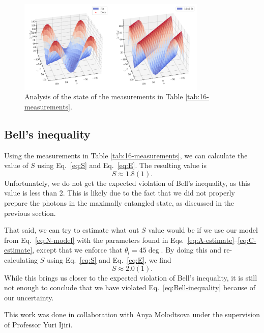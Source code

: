 \documentclass{../paper}
\newcommand{\eq}[1]{Eq.~\eqref{#1}}
\newcommand{\eqs}[2]{Eqs.~\eqref{#1}--\eqref{#2}}
\begin{document}
\begin{figure}
  \centering
  \includegraphics[width=0.8\textwidth]{analysis/state.pdf}
  \caption{Analysis of the state of the measurements in Table \ref{tab:16-measurements}.}
  \label{fig:state}
\end{figure}

\subsection{Bell's inequality}

Using the measurements in Table \ref{tab:16-measurements}, we can calculate the value of $S$ using \eq{eq:S} and \eq{eq:E}. The resulting value is
\begin{equation}
  S \approx 1.8(1).
\end{equation}
Unfortunately, we do not get the expected violation of Bell's inequality, as this value is less than 2. This is likely due to the fact that we did not properly prepare the photons in the maximally entangled state, as discussed in the previous section.

That said, we can try to estimate what out $S$ value would be if we use our model from \eq{eq:N-model} with the parameters found in \eqs{eq:A-estimate}{eq:C-estimate}, except that we enforce that $\theta_l = 45\deg$. By doing this and re-calculating $S$ using \eq{eq:S} and \eq{eq:E}, we find
\begin{equation}
  S \approx 2.0(1).
\end{equation}
While this brings us closer to the expected violation of Bell's inequality, it is still not enough to conclude that we have violated \eq{eq:Bell-inequality} because of our uncertainty.

\begin{acknowledgements}
  This work was done in collaboration with Anya Molodtsova under the supervision of Professor Yuri Ijiri.
\end{acknowledgements}


\end{document}
